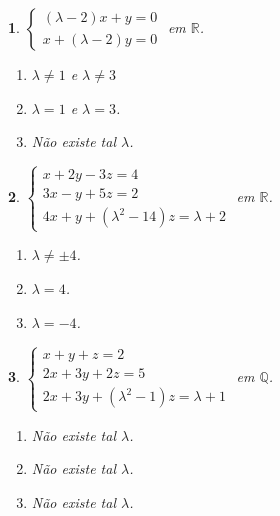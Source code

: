 \documentclass[12pt]{exam}
\newtheorem{exercicio}{}
\newcommand{\rac}{\mathbb{Q}}
\newcommand{\real}{\mathbb{R}}
\begin{document}
\begin{exercicio}\label{sistemasinicio}
$\begin{cases}
  (\lambda - 2)x + y = 0\\
  x + (\lambda - 2)y = 0
\end{cases}$ em $\real$.
\begin{solucao}
  \begin{enumerate}[label={\alph*})]
    \item $\lambda \ne 1$ e $\lambda \ne 3$
    \item $\lambda = 1$ e $\lambda = 3$.
    \item N\~ao existe tal $\lambda$.
  \end{enumerate}
\end{solucao}
\end{exercicio}

\begin{exercicio}
$\begin{cases}
  x + 2y - 3z = 4\\
  3x - y + 5z = 2\\
  4x + y + (\lambda^2 - 14)z = \lambda + 2
\end{cases}$ em $\real$.
\begin{solucao}
  \begin{enumerate}[label={\alph*})]
    \item $\lambda \ne \pm 4$.
    \item $\lambda = 4$.
    \item $\lambda = -4$.
  \end{enumerate}
\end{solucao}
\end{exercicio}

\begin{exercicio}
$\begin{cases}
  x + y + z = 2\\
  2x + 3y + 2z = 5\\
  2x + 3y + (\lambda^2 - 1)z = \lambda + 1
\end{cases}$ em $\rac$.
\begin{solucao}
  \begin{enumerate}[label={\alph*})]
    \item N\~ao existe tal $\lambda$.
    \item N\~ao existe tal $\lambda$.
    \item N\~ao existe tal $\lambda$.
  \end{enumerate}
\end{solucao}
\end{exercicio}
\end{document}
